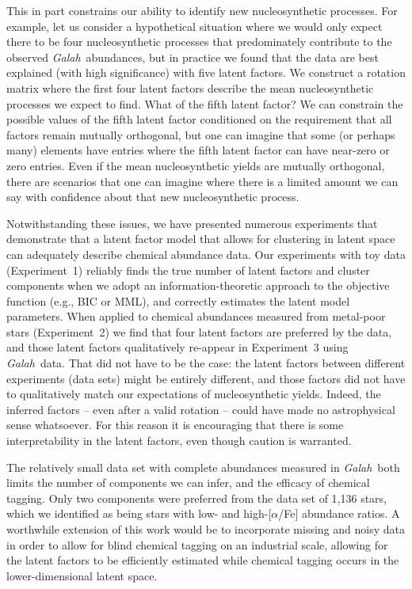 \documentclass[twocolumn]{aastex62}
\newcommand{\project}[1]{\textsl{#1}}
\newcommand{\Galah}{\project{Galah}}
\begin{document}
This in part constrains our ability to identify new nucleosynthetic processes. For example,
let us consider a hypothetical situation where we would only expect there to be four 
nucleosynthetic processes that predominately contribute to the observed \Galah\ abundances,
but in practice we found that the data are best explained (with high significance) with
five latent factors. We construct a rotation matrix where the first four latent factors
describe the mean nucleosynthetic processes we expect to find. What of the fifth latent
factor? We can constrain the possible values of the fifth latent factor conditioned on
the requirement that all factors remain mutually orthogonal, but one can imagine that
some (or perhaps many) elements have entries where the fifth latent factor can have
near-zero or zero entries. Even if the mean nucleosynthetic yields are mutually
orthogonal, there are scenarios that one can imagine where there is a limited amount
we can say with confidence about that new nucleosynthetic process.

Notwithstanding these issues, we have presented numerous experiments that demonstrate
that a latent factor model that allows for clustering in latent space can adequately
describe chemical abundance data. Our experiments with toy data (Experiment~1) reliably
finds the true number of latent factors and cluster components when we adopt an information-theoretic approach to the objective function (e.g., BIC or MML), and correctly estimates the latent
model parameters. When applied to chemical abundances measured from metal-poor stars 
(Experiment~2) we find that four latent factors are preferred by the data, and
those latent factors qualitatively re-appear in Experiment~3 using \Galah\ data. 
That did not have to be the case: the latent factors between different experiments (data sets)
might be entirely different, and those factors did not have to qualitatively match our
expectations of nucleosynthetic yields. Indeed, the inferred factors -- even after a
valid rotation -- could have made no astrophysical sense whatsoever. For this reason it
is encouraging that there is some interpretability in the latent factors, even though 
caution is warranted.

The relatively small data set with complete abundances measured in \Galah\ both limits
the number of components we can infer, and the efficacy of chemical tagging. Only two
components were preferred from the data set of 1,136 stars, which we identified as
being stars with low- and high-[$\alpha$/Fe] abundance ratios. A worthwhile extension
of this work would be to incorporate missing and noisy data in order to allow for
blind chemical tagging on an industrial scale, allowing for the latent factors to
be efficiently estimated while chemical tagging occurs in the lower-dimensional
latent space.
\end{document}
